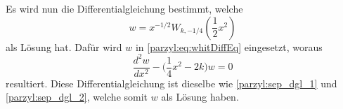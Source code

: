 %
Es wird nun die Differentialgleichung bestimmt, welche
\begin{equation}
    w = x^{-1/2} W_{k,-1/4} ({\textstyle \frac{1}{2}} x^2)
\end{equation}
als Lösung hat.
Dafür wird $w$ in \eqref{parzyl:eq:whitDiffEq} eingesetzt, woraus
\begin{equation}
    \frac{d^2 w}{dx^2} - \biggl(\frac{1}{4} x^2 - 2k\biggr) w = 0
\label{parzyl:eq:weberDiffEq}
\end{equation}
resultiert.
Diese Differentialgleichung ist dieselbe wie 
\eqref{parzyl:sep_dgl_1} und \eqref{parzyl:sep_dgl_2}, welche somit
$w$ als Lösung haben.
